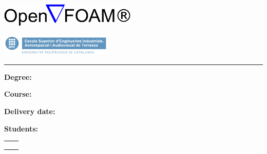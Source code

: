 


\begin{center}\bf

\includegraphics[width=0.50\textwidth]{./doc_config/images/openfoamlogotm.png}

\vspace{50pt}


\vspace{10pt}

\includegraphics[width=0.4\textwidth]{./doc_config/images/UPC_ESEIAAT.jpg}

\vspace{40pt}

\vspace{10pt}



{\Large \ProjectName}

\textcolor{UPC_blue}{\rule{\textwidth}{.6pt}}

{\Large \DocType}

\end{center}

\vspace{10pt}

\textbf{Degree:} \Degree

\textbf{Course:} \Course


\textbf{Delivery date:} \DocDate\\

\vspace{10pt}

\textbf{Students:}\vspace{7pt}

\begin{tabular}{ll}
	\Studi    \hspace*{30pt}\\
	\Studii   \hspace*{30pt}\\
	\Studiii  \hspace*{30pt} \\
	
\end{tabular}\\

\vspace{10pt}